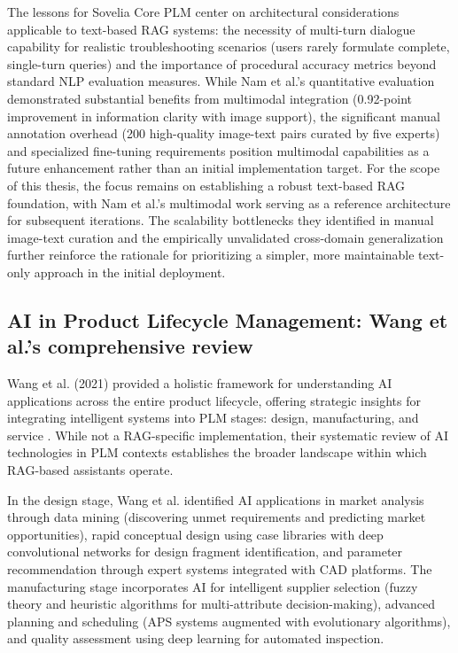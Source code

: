 The lessons for Sovelia Core PLM center on architectural considerations applicable to text-based RAG systems: the necessity of multi-turn dialogue capability for realistic troubleshooting scenarios (users rarely formulate complete, single-turn queries) and the importance of procedural accuracy metrics beyond standard NLP evaluation measures. While Nam et al.'s quantitative evaluation demonstrated substantial benefits from multimodal integration (0.92-point improvement in information clarity with image support), the significant manual annotation overhead (200 high-quality image-text pairs curated by five experts) and specialized fine-tuning requirements position multimodal capabilities as a future enhancement rather than an initial implementation target. For the scope of this thesis, the focus remains on establishing a robust text-based RAG foundation, with Nam et al.'s multimodal work serving as a reference architecture for subsequent iterations. The scalability bottlenecks they identified in manual image-text curation and the empirically unvalidated cross-domain generalization further reinforce the rationale for prioritizing a simpler, more maintainable text-only approach in the initial deployment.

\subsection{AI in Product Lifecycle Management: Wang et al.'s comprehensive review}

Wang et al. (2021) provided a holistic framework for understanding AI applications across the entire product lifecycle, offering strategic insights for integrating intelligent systems into PLM stages: design, manufacturing, and service \parencite{wang_artificial_2021}. While not a RAG-specific implementation, their systematic review of AI technologies in PLM contexts establishes the broader landscape within which RAG-based assistants operate.

In the design stage, Wang et al. identified AI applications in market analysis through data mining (discovering unmet requirements and predicting market opportunities), rapid conceptual design using case libraries with deep convolutional networks for design fragment identification, and parameter recommendation through expert systems integrated with CAD platforms. The manufacturing stage incorporates AI for intelligent supplier selection (fuzzy theory and heuristic algorithms for multi-attribute decision-making), advanced planning and scheduling (APS systems augmented with evolutionary algorithms), and quality assessment using deep learning for automated inspection.

